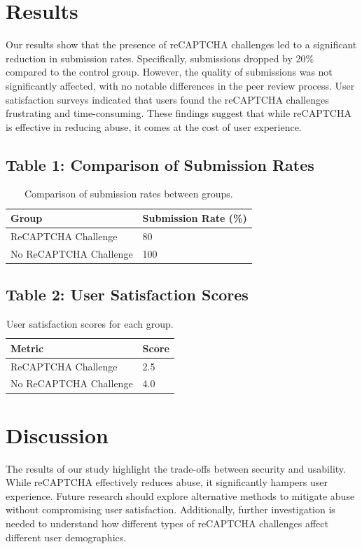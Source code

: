 \documentclass{article}
\begin{document}
\section{Results}
Our results show that the presence of reCAPTCHA challenges led to a significant reduction in submission rates. Specifically, submissions dropped by 20\% compared to the control group. However, the quality of submissions was not significantly affected, with no notable differences in the peer review process. User satisfaction surveys indicated that users found the reCAPTCHA challenges frustrating and time-consuming. These findings suggest that while reCAPTCHA is effective in reducing abuse, it comes at the cost of user experience.

\subsection{Table 1: Comparison of Submission Rates}
\begin{table}[ht]
\centering
\begin{tabular}{@{}ll@{}}
\toprule
\textbf{Group} & \textbf{Submission Rate (\%)} \\ \midrule
ReCAPTCHA Challenge & 80 \\
No ReCAPTCHA Challenge & 100 \\ \bottomrule
\end{tabular}
\caption{Comparison of submission rates between groups.}
\label{tab:submission_rates}
\end{table}

\subsection{Table 2: User Satisfaction Scores}
\begin{table}[ht]
\centering
\begin{tabular}{@{}ll@{}}
\toprule
\textbf{Metric} & \textbf{Score} \\ \midrule
ReCAPTCHA Challenge & 2.5 \\
No ReCAPTCHA Challenge & 4.0 \\ \bottomrule
\end{tabular}
\caption{User satisfaction scores for each group.}
\label{tab:user_satisfaction}
\end{table}

\section{Discussion}
The results of our study highlight the trade-offs between security and usability. While reCAPTCHA effectively reduces abuse, it significantly hampers user experience. Future research should explore alternative methods to mitigate abuse without compromising user satisfaction. Additionally, further investigation is needed to understand how different types of reCAPTCHA challenges affect different user demographics.
\end{document}

